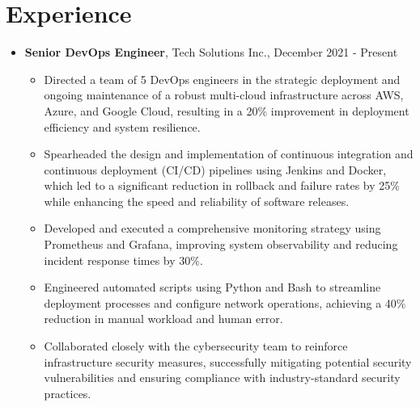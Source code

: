 \documentclass[a4paper,10pt]{article}
\begin{document}
\section*{Experience}
\begin{itemize}

\item \textbf{Senior DevOps Engineer}, Tech Solutions Inc., December 2021 - Present
        \begin{itemize}
            \item Directed a team of 5 DevOps engineers in the strategic deployment and ongoing maintenance of a robust multi-cloud infrastructure across AWS, Azure, and Google Cloud, resulting in a 20\% improvement in deployment efficiency and system resilience.
            \item Spearheaded the design and implementation of continuous integration and continuous deployment (CI/CD) pipelines using Jenkins and Docker, which led to a significant reduction in rollback and failure rates by 25\% while enhancing the speed and reliability of software releases.
            \item Developed and executed a comprehensive monitoring strategy using Prometheus and Grafana, improving system observability and reducing incident response times by 30\%.
            \item Engineered automated scripts using Python and Bash to streamline deployment processes and configure network operations, achieving a 40\% reduction in manual workload and human error.
            \item Collaborated closely with the cybersecurity team to reinforce infrastructure security measures, successfully mitigating potential security vulnerabilities and ensuring compliance with industry-standard security practices.
        \end{itemize}


\end{itemize}
\end{document}
